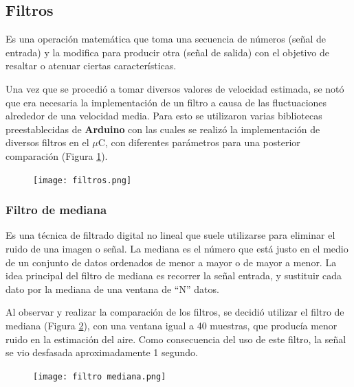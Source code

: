 \subsection{Filtros}
\begin{tcolorbox}[colback=blue!5!white,colframe=blue!75!black,title=Filtro digital]
Es una operación	matemática que toma una secuencia de números (señal de entrada) y la
	modifica para producir otra (señal de salida) con el objetivo de resaltar o atenuar ciertas características.
\end{tcolorbox}

Una vez que se procedió a tomar diversos valores de velocidad estimada, se notó que era necesaria la implementación
de un filtro a causa de las fluctuaciones alrededor de una velocidad media. Para esto se utilizaron varias bibliotecas preestablecidas de \textbf{Arduino} con las cuales se realizó la implementación de diversos filtros en el $\mu$C, con diferentes parámetros para una posterior comparación (Figura \ref{fig:filtros}).


\begin{figure}[H]
	\centering
	\texttt{[image: filtros.png]}
	\label{fig:filtros}
\end{figure}


\subsubsection{Filtro de mediana}
\begin{tcolorbox}[colback=blue!5!white,colframe=blue!75!black,title=Mediana]
	Es una técnica de filtrado digital no lineal que suele utilizarse para eliminar el ruido de una imagen o señal. La mediana es el número que está justo en el medio de un conjunto de datos ordenados de menor a mayor o de mayor a menor.
	La idea principal del filtro de mediana es recorrer la señal entrada, y sustituir cada dato por la mediana de una ventana de “N” datos.
\end{tcolorbox}

Al observar y realizar la comparación de los filtros, se decidió utilizar el filtro de mediana (Figura \ref{fig:filtrosm}), con una ventana igual a 
40 muestras, que producía menor ruido en la estimación del aire. Como consecuencia del uso de este filtro, la señal se vio desfasada aproximadamente 1 segundo.

\begin{figure}[H]
	\centering
	\texttt{[image: filtro mediana.png]}
	\label{fig:filtrosm}
\end{figure}




